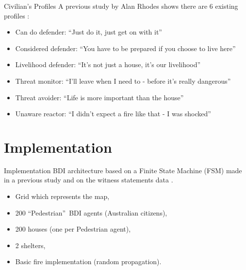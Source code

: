 \documentclass{beamer}
\begin{document}
    \begin{frame}{Civilian's Profiles}
      A previous study by Alan Rhodes shows there are 6 existing profiles \cite{rhodes2014}:

      \begin{itemize}
        \item Can do defender: \textquotedblleft Just do it, just get on with it\textquotedblright
        \item Considered defender: \textquotedblleft You have to be prepared if you choose to live here\textquotedblright
        \item Livelihood defender: \textquotedblleft It's not just a house, it's our livelihood\textquotedblright
        \item Threat monitor: \textquotedblleft I'll leave when I need to - before it's really dangerous\textquotedblright
        \item Threat avoider: \textquotedblleft Life is more important than the house\textquotedblright
        \item Unaware reactor: \textquotedblleft I didn't expect a fire like that - I was shocked\textquotedblright
      \end{itemize}
    \end{frame}

  \section{Implementation}

    \begin{frame}{Implementation}
      BDI architecture based on a Finite State Machine (FSM) made in a previous study \cite{adam2015} and on the witness statements
      data \cite{witness}.
      \begin{itemize}
        \item Grid which represents the map,
        \item 200 \textquotedblleft Pedestrian\textquotedblright ~BDI agents (Australian citizens),
        \item 200 houses (one per Pedestrian agent),
        \item 2 shelters,
        \item Basic fire implementation (random propagation).
      \end{itemize}
    \end{frame}
\end{document}
